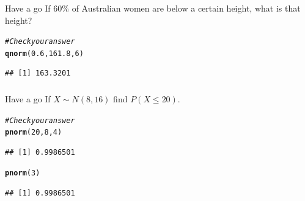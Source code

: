 \documentclass[t,xcolor=pdftex,dvipsnames,table]{beamer}
\makeatletter
\newcommand{\hlnum}[1]{\textcolor[rgb]{0.686,0.059,0.569}{#1}}%
\newcommand{\hlcom}[1]{\textcolor[rgb]{0.678,0.584,0.686}{\textit{#1}}}%
\newcommand{\hlstd}[1]{\textcolor[rgb]{0.345,0.345,0.345}{#1}}%
\newcommand{\hlkwd}[1]{\textcolor[rgb]{0.737,0.353,0.396}{\textbf{#1}}}%
\newenvironment{kframe}{%
 \def\at@end@of@kframe{}%
 \ifinner\ifhmode%
  \def\at@end@of@kframe{\end{minipage}}%
  \begin{minipage}{\columnwidth}%
 \fi\fi%
 \def\FrameCommand##1{\hskip\@totalleftmargin \hskip-\fboxsep
 \colorbox{shadecolor}{##1}\hskip-\fboxsep
     \hskip-\linewidth \hskip-\@totalleftmargin \hskip\columnwidth}%
 \MakeFramed {\advance\hsize-\width
   \@totalleftmargin\z@ \linewidth\hsize
   \@setminipage}}%
 {\par\unskip\endMakeFramed%
 \at@end@of@kframe}
\newenvironment{knitrout}{}{} %
\makeatother
\begin{document}
\begin{frame}[fragile]\frametitle{}

\begin{alertblock}{Have a go}
If 60\% of Australian women are below a certain height, what is that height?
\end{alertblock}

\begin{knitrout}
\color{fgcolor}\begin{kframe}
\begin{alltt}
\hlcom{#Check your answer}
\hlkwd{qnorm}\hlstd{(}\hlnum{0.6}\hlstd{,}\hlnum{161.8}\hlstd{,}\hlnum{6}\hlstd{)}
\end{alltt}
\begin{verbatim}
## [1] 163.3201
\end{verbatim}
\end{kframe}
\end{knitrout}
\end{frame}

\begin{frame}[fragile]\frametitle{}

\begin{alertblock}{Have a go}
If $X \sim N(8,16)$ find $P(X \leq 20)$.

\end{alertblock}

\begin{knitrout}
\color{fgcolor}\begin{kframe}
\begin{alltt}
\hlcom{#Check your answer}
\hlkwd{pnorm}\hlstd{(}\hlnum{20}\hlstd{,}\hlnum{8}\hlstd{,}\hlnum{4}\hlstd{)}
\end{alltt}
\begin{verbatim}
## [1] 0.9986501
\end{verbatim}
\begin{alltt}
\hlkwd{pnorm}\hlstd{(}\hlnum{3}\hlstd{)}
\end{alltt}
\begin{verbatim}
## [1] 0.9986501
\end{verbatim}
\end{kframe}
\end{knitrout}

\end{frame}
\end{document}
